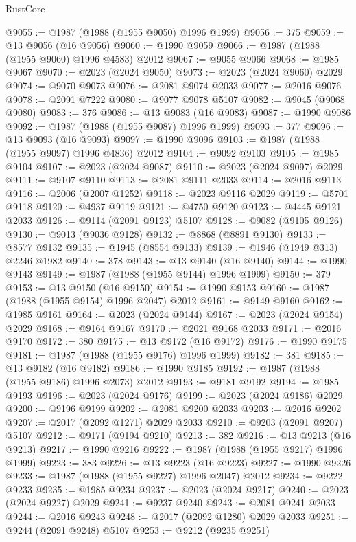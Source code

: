 \begin{lexlean}{RustCore}
\begin{coremodule}
@9055 := @1987 (@1988 (@1955 @9050) @1996 @1999)
@9056 := 375
@9059 := @13 @9056 (@16 @9056)
@9060 := @1990 @9059
@9066 := @1987 (@1988 (@1955 @9060) @1996 @4583) @2012
@9067 := @9055 @9066
@9068 := @1985 @9067
@9070 := @2023 (@2024 @9050)
@9073 := @2023 (@2024 @9060) @2029
@9074 := @9070 @9073
@9076 := @2081 @9074 @2033
@9077 := @2016 @9076
@9078 := @2091 @7222
@9080 := @9077 @9078 @5107
@9082 := @9045 (@9068 @9080)
@9083 := 376
@9086 := @13 @9083 (@16 @9083)
@9087 := @1990 @9086
@9092 := @1987 (@1988 (@1955 @9087) @1996 @1999)
@9093 := 377
@9096 := @13 @9093 (@16 @9093)
@9097 := @1990 @9096
@9103 := @1987 (@1988 (@1955 @9097) @1996 @4836) @2012
@9104 := @9092 @9103
@9105 := @1985 @9104
@9107 := @2023 (@2024 @9087)
@9110 := @2023 (@2024 @9097) @2029
@9111 := @9107 @9110
@9113 := @2081 @9111 @2033
@9114 := @2016 @9113
@9116 := @2006 (@2007 @1252)
@9118 := @2023 @9116 @2029
@9119 := @5701 @9118
@9120 := @4937 @9119
@9121 := @4750 @9120
@9123 := @4445 @9121 @2033
@9126 := @9114 (@2091 @9123) @5107
@9128 := @9082 (@9105 @9126)
@9130 := @9013 (@9036 @9128)
@9132 := @8868 (@8891 @9130)
@9133 := @8577 @9132
@9135 := @1945 (@8554 @9133)
@9139 := @1946 (@1949 @313) @2246 @1982
@9140 := 378
@9143 := @13 @9140 (@16 @9140)
@9144 := @1990 @9143
@9149 := @1987 (@1988 (@1955 @9144) @1996 @1999)
@9150 := 379
@9153 := @13 @9150 (@16 @9150)
@9154 := @1990 @9153
@9160 := @1987 (@1988 (@1955 @9154) @1996 @2047) @2012
@9161 := @9149 @9160
@9162 := @1985 @9161
@9164 := @2023 (@2024 @9144)
@9167 := @2023 (@2024 @9154) @2029
@9168 := @9164 @9167
@9170 := @2021 @9168 @2033
@9171 := @2016 @9170
@9172 := 380
@9175 := @13 @9172 (@16 @9172)
@9176 := @1990 @9175
@9181 := @1987 (@1988 (@1955 @9176) @1996 @1999)
@9182 := 381
@9185 := @13 @9182 (@16 @9182)
@9186 := @1990 @9185
@9192 := @1987 (@1988 (@1955 @9186) @1996 @2073) @2012
@9193 := @9181 @9192
@9194 := @1985 @9193
@9196 := @2023 (@2024 @9176)
@9199 := @2023 (@2024 @9186) @2029
@9200 := @9196 @9199
@9202 := @2081 @9200 @2033
@9203 := @2016 @9202
@9207 := @2017 (@2092 @1271) @2029 @2033
@9210 := @9203 (@2091 @9207) @5107
@9212 := @9171 (@9194 @9210)
@9213 := 382
@9216 := @13 @9213 (@16 @9213)
@9217 := @1990 @9216
@9222 := @1987 (@1988 (@1955 @9217) @1996 @1999)
@9223 := 383
@9226 := @13 @9223 (@16 @9223)
@9227 := @1990 @9226
@9233 := @1987 (@1988 (@1955 @9227) @1996 @2047) @2012
@9234 := @9222 @9233
@9235 := @1985 @9234
@9237 := @2023 (@2024 @9217)
@9240 := @2023 (@2024 @9227) @2029
@9241 := @9237 @9240
@9243 := @2081 @9241 @2033
@9244 := @2016 @9243
@9248 := @2017 (@2092 @1280) @2029 @2033
@9251 := @9244 (@2091 @9248) @5107
@9253 := @9212 (@9235 @9251)

\end{coremodule}
\end{lexlean}
